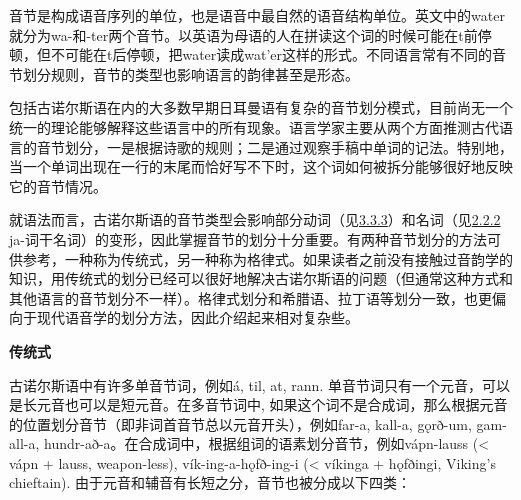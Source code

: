 音节是构成语音序列的单位，也是语音中最自然的语音结构单位。英文中的water就分为wa-和-ter两个音节。以英语为母语的人在拼读这个词的时候可能在t前停顿，但不可能在t后停顿，把water读成wat'er这样的形式。不同语言常有不同的音节划分规则，音节的类型也影响语言的韵律甚至是形态。

包括古诺尔斯语在内的大多数早期日耳曼语有复杂的音节划分模式，目前尚无一个统一的理论能够解释这些语言中的所有现象。语言学家主要从两个方面推测古代语言的音节划分，一是根据诗歌的规则；二是通过观察手稿中单词的记法。特别地，当一个单词出现在一行的末尾而恰好写不下时，这个词如何被拆分能够很好地反映它的音节情况。

就语法而言，古诺尔斯语的音节类型会影响部分动词（见\hyperref[ux7b2cux4e00ux5f31ux53d8ux4f4dux6cd5]{3.3.3}）和名词（见\hyperref[ajawa-ux8bcdux5e72]{2.2.2}
ja-词干名词）的变形，因此掌握音节的划分十分重要。有两种音节划分的方法可供参考，一种称为传统式，另一种称为格律式。如果读者之前没有接触过音韵学的知识，用传统式的划分已经可以很好地解决古诺尔斯语的问题（但通常这种方式和其他语言的音节划分不一样）。格律式划分和希腊语、拉丁语等划分一致，也更偏向于现代语音学的划分方法，因此介绍起来相对复杂些。

\textbf{传统式}

古诺尔斯语中有许多单音节词，例如á, til, at, rann.
单音节词只有一个元音，可以是长元音也可以是短元音。在多音节词中,
如果这个词不是合成词，那么根据元音的位置划分音节（即非词首音节总以元音开头），例如far-a,
kall-a, gǫrð-um, gam-all-a,
hundr-að-a。在合成词中，根据组词的语素划分音节，例如vápn-lauss
(\textless{} vápn + lauss, weapon-less), vík-ing-a-hǫfð-ing-i
(\textless{} víkinga + hǫfðingi, Viking's chieftain).
由于元音和辅音有长短之分，音节也被分成以下四类：

